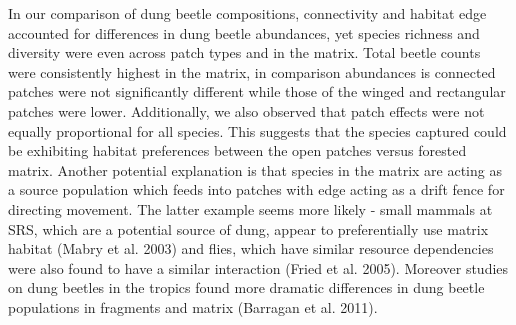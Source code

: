 \documentclass[
  man, donotrepeattitle]{apa6}
\begin{document}
In our comparison of dung beetle compositions, connectivity and habitat edge accounted for differences in dung beetle abundances, yet species richness and diversity were even across patch types and in the matrix. Total beetle counts were consistently highest in the matrix, in comparison abundances is connected patches were not significantly different while those of the winged and rectangular patches were lower. Additionally, we also observed that patch effects were not equally proportional for all species. This suggests that the species captured could be exhibiting habitat preferences between the open patches versus forested matrix. Another potential explanation is that species in the matrix are acting as a source population which feeds into patches with edge acting as a drift fence for directing movement. The latter example seems more likely - small mammals at SRS, which are a potential source of dung, appear to preferentially use matrix habitat (Mabry et al. 2003) and flies, which have similar resource dependencies were also found to have a similar interaction (Fried et al. 2005). Moreover studies on dung beetles in the tropics found more dramatic differences in dung beetle populations in fragments and matrix (Barragan et al. 2011).
\end{document}
